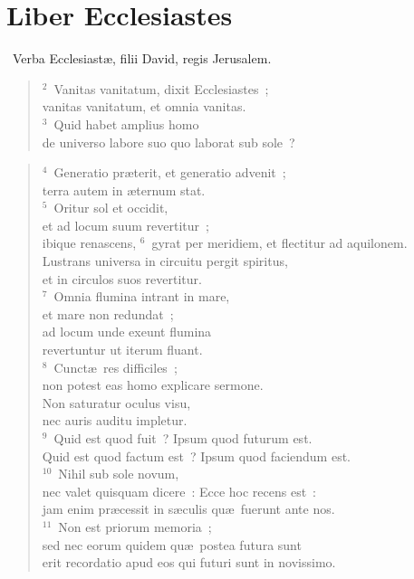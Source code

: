 \clearpage
{\centering \section*{Liber Ecclesiastes}}\thispagestyle{empty}

~Verba Ecclesiast\ae , filii David, regis Jerusalem.
\begin{flushleft}\begin{verse}\vspace{6pt}${}^{2}$~Vanitas vanitatum, dixit Ecclesiastes~;\\ vanitas vanitatum, et omnia vanitas.\\
${}^{3}$~Quid habet amplius homo\\ de universo labore suo quo laborat sub sole~?\end{verse}\end{flushleft}


\begin{flushleft}\begin{verse}${}^{4}$~Generatio pr\ae terit, et generatio advenit~;\\ terra autem in \ae ternum stat.\\
${}^{5}$~Oritur sol et occidit,\\ et ad locum suum revertitur~;\\ ibique renascens,
${}^{6}$~gyrat per meridiem, et flectitur ad aquilonem.\\ Lustrans universa in circuitu pergit spiritus,\\ et in circulos suos revertitur.\\
${}^{7}$~Omnia flumina intrant in mare,\\ et mare non redundat~;\\ ad locum unde exeunt flumina\\ revertuntur ut iterum fluant.\\
${}^{8}$~Cunct\ae\ res difficiles~;\\ non potest eas homo explicare sermone.\\ Non saturatur oculus visu,\\ nec auris auditu impletur.\\
${}^{9}$~Quid est quod fuit~? Ipsum quod futurum est.\\ Quid est quod factum est~? Ipsum quod faciendum est.\\
${}^{10}$~Nihil sub sole novum,\\ nec valet quisquam dicere~: Ecce hoc recens est~:\\ jam enim pr\ae cessit in s\ae culis qu\ae\ fuerunt ante nos.\\
${}^{11}$~Non est priorum memoria~;\\ sed nec eorum quidem qu\ae\ postea futura sunt\\ erit recordatio apud eos qui futuri sunt in novissimo.\end{verse}\end{flushleft}


